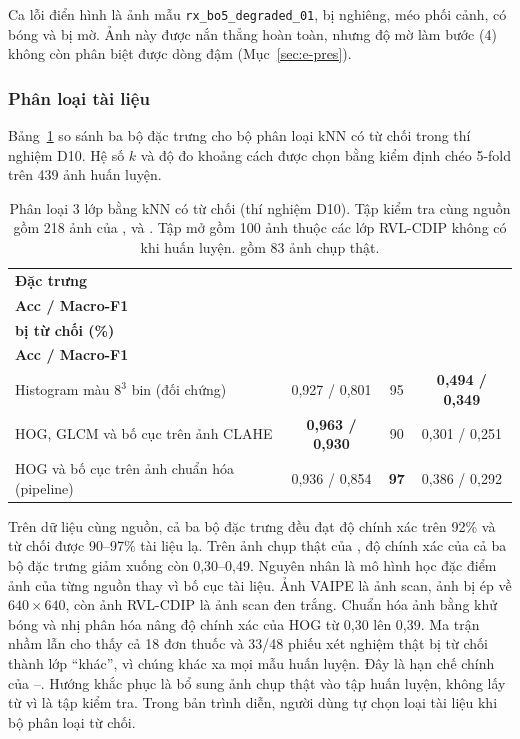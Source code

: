 Ca lỗi điển hình là ảnh mẫu \texttt{rx\_bo5\_degraded\_01}, bị nghiêng, méo phối cảnh, có bóng và bị mờ.
Ảnh này được nắn thẳng hoàn toàn, nhưng độ mờ làm bước (4) không còn phân biệt được dòng đậm (Mục~\ref{sec:e-pres}).

\subsubsection{Phân loại tài liệu}
Bảng~\ref{tab:D10} so sánh ba bộ đặc trưng cho bộ phân loại kNN có từ chối trong thí nghiệm D10.
Hệ số $k$ và độ đo khoảng cách được chọn bằng kiểm định chéo 5-fold trên 439 ảnh huấn luyện.

\begin{table}[H]
\centering
\caption{Phân loại 3 lớp bằng kNN có từ chối (thí nghiệm D10).
Tập kiểm tra cùng nguồn gồm 218 ảnh của ,  và .
Tập mở gồm 100 ảnh thuộc các lớp RVL-CDIP không có khi huấn luyện.
 gồm 83 ảnh chụp thật.}\label{tab:D10}
\small
\begin{tabular}{lccc}
\toprule
\textbf{Đặc trưng} & \makecell{\textbf{Cùng nguồn:}\\\textbf{Acc / Macro-F1}} & \makecell{\textbf{Tập mở:}\\\textbf{bị từ chối (\%)}} & \makecell{\textbf{\Bo{4}:}\\\textbf{Acc / Macro-F1}} \\
\midrule
Histogram màu $8^3$ bin (đối chứng) & 0,927 / 0,801 & 95 & \textbf{0,494 / 0,349} \\
HOG, GLCM và bố cục trên ảnh CLAHE & \textbf{0,963 / 0,930} & 90 & 0,301 / 0,251 \\
HOG và bố cục trên ảnh chuẩn hóa (pipeline) & 0,936 / 0,854 & \textbf{97} & 0,386 / 0,292 \\
\bottomrule
\end{tabular}
\end{table}

Trên dữ liệu cùng nguồn, cả ba bộ đặc trưng đều đạt độ chính xác trên 92\% và từ chối được 90--97\% tài liệu lạ.
Trên ảnh chụp thật của , độ chính xác của cả ba bộ đặc trưng giảm xuống còn 0,30--0,49.
Nguyên nhân là mô hình học đặc điểm ảnh của từng nguồn thay vì bố cục tài liệu.
Ảnh VAIPE là ảnh scan, ảnh  bị ép về $640\times640$, còn ảnh RVL-CDIP là ảnh scan đen trắng.
Chuẩn hóa ảnh bằng khử bóng và nhị phân hóa nâng độ chính xác của HOG từ 0,30 lên 0,39.
Ma trận nhầm lẫn cho thấy cả 18 đơn thuốc và 33/48 phiếu xét nghiệm thật bị từ chối thành lớp ``khác'', vì chúng khác xa mọi mẫu huấn luyện.
Đây là hạn chế chính của --.
Hướng khắc phục là bổ sung ảnh chụp thật vào tập huấn luyện, không lấy từ  vì  là tập kiểm tra.
Trong bản trình diễn, người dùng tự chọn loại tài liệu khi bộ phân loại từ chối.
